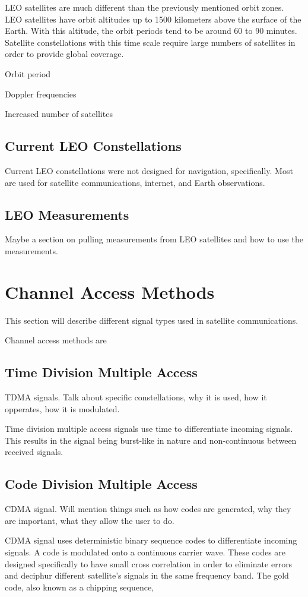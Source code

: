 \documentclass[12pt]{report}
\begin{document}
LEO satellites are much different than the previously mentioned orbit zones. LEO satellites have orbit altitudes up to 1500 kilometers above the surface of the Earth. With this altitude, the orbit periods tend to be around 60 to 90 minutes. Satellite constellations with this time scale require large numbers of satellites in order to provide global coverage.

Orbit period

Doppler frequencies

Increased number of satellites

\subsection{Current LEO Constellations}
Current LEO constellations were not designed for navigation, specifically. Most are used for satellite communications, internet, and Earth observations. 

\subsection{LEO Measurements}
Maybe a section on pulling measurements from LEO satellites and how to use the measurements. 

\section{Channel Access Methods}
This section will describe different signal types used in satellite communications.

Channel access methods are 
\subsection{Time Division Multiple Access}
TDMA signals. Talk about specific constellations, why it is used, how it opperates, how it is modulated. 

Time division multiple access signals use time to differentiate incoming signals. This results in the signal being burst-like in nature and non-continuous between received signals. 

\subsection{Code Division Multiple Access}
CDMA signal. Will mention things such as how codes are generated, why they are important, what they allow the user to do.

CDMA signal uses deterministic binary sequence codes to differentiate incoming signals. A code is modulated onto a continuous carrier wave. These codes are designed specifically to have small cross correlation in order to eliminate errors and deciphur different satellite's signals in the same frequency band. The gold code, also known as a chipping sequence, 
\end{document}

